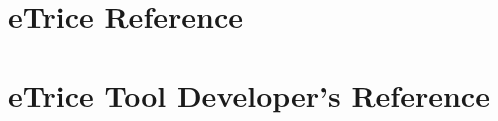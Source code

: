 \documentclass[a4paper,oneside,10pt]{book}
\begin{document}
%
%
%



\chapter{eTrice Reference}


\chapter{eTrice{} Tool Developer's Reference}


\end{document}
